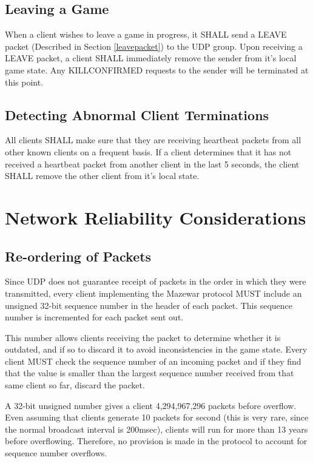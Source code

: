 \documentclass[11pt]{article} %
\begin{document}
\subsection{Leaving a Game}
\label{leaveoperation}
When a client wishes to leave a game in progress, it SHALL send a LEAVE packet
(Described in Section \ref{leavepacket}) to the UDP group. Upon receiving a LEAVE
packet, a client SHALL immediately remove the sender from it's local
game state. Any KILLCONFIRMED requests to the sender will be terminated at this
point.

\subsection{Detecting Abnormal Client Terminations}
\label{timeout}
All clients SHALL make sure that they are receiving heartbeat packets from all
other known clients on a frequent basis. If a client determines that it has not
received a heartbeat packet from another client in the last 5 seconds,
the client SHALL remove the other client from it's local state.

\section{Network Reliability Considerations}
\subsection{Re-ordering of Packets}
Since UDP does not guarantee receipt of packets in the order in which they were
transmitted, every client implementing the Mazewar protocol MUST include an
unsigned 32-bit sequence number in the header of each packet. This sequence 
number is incremented for each packet sent out.

	This number allows clients receiving the packet to determine whether it is
outdated, and if so to discard it to avoid inconsistencies in the game state.
Every client MUST check the sequence number of an incoming packet and if they
find that the value is smaller than the largest sequence number received from
that same client so far, discard the packet.

	A 32-bit unsigned number gives a client 4,294,967,296 packets before
overflow. Even assuming that clients generate 10 packets for second (this is
very rare, since the normal broadcast interval is 200msec), clients will run for
more than 13 years before overflowing. Therefore, no provision is made in the
protocol to account for sequence number overflows.
\end{document}
